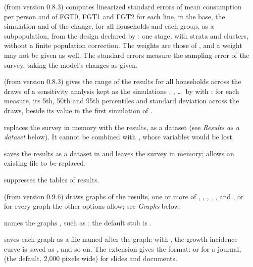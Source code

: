 \begin{optdesc}
\item[\opt{}{svy}] (from version 0.8.3) computes linearized standard errors
of mean consumption per person and of FGT0, FGT1 and FGT2 for each line, in
the base, the simulation and of the change, for all households and each
group, as a subpopulation, from the design declared by : one
stage, with strata and clusters, without a finite population correction. The
weights are those of , and a weight may not be given as well.
The standard errors measure the sampling error of the survey, taking the
model's changes as given.

\item[\optarg{band}{s}{name}] (from version 0.8.3) gives the range of the
results for all households across the draws of a sensitivity analysis kept
as the simulations , , \ldots\ by
 with \cmd{)}: for each measure,
its 5th, 50th and 95th percentiles and standard deviation across the draws,
beside its value in the first simulation of .

\item[\opt{}{clear}] replaces the survey in memory with the results, as a
dataset (see \emph{Results as a dataset} below). It cannot be combined with
, whose variables would be lost.

\item[\optarg{sav}{ing}{filename[\texttt{, replace}]}] saves the results as a
dataset in  and leaves the survey in memory; 
allows an existing file to be replaced.

\item[\opt{nod}{isplay}] suppresses the tables of results.

\item[\optarg{}{graph}{graphs}] (from version 0.9.6) draws graphs of the
results, one or more of , , ,
, ,  and , or  for
every graph the other options allow; see \emph{Graphs} below.

\item[\optarg{}{gname}{stub}] names the graphs \cmd{_},
such as ; the default stub is .

\item[\optarg{}{gexport}{filename}] saves each graph as a file named after
the graph: with , the growth incidence curve is saved
as , and so on. The extension gives the format: 
or  for a journal,  (the default, 2,000 pixels wide) for
slides and documents.


\end{optdesc}
